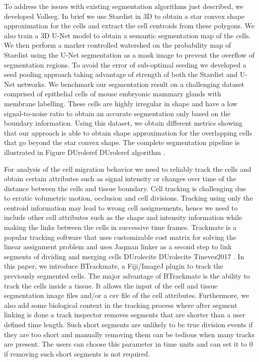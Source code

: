 \documentclass[letterpaper,compsoc,twoside]{IEEEtran}
\providecommand*{\DUrole}[2]{%
  \ifcsname DUrole#1\endcsname%
    \csname DUrole#1\endcsname{#2}%
  \else%
    #2%
  \fi%
}
\begin{document}
To address the issues with existing segmentation algorithms just described, we developed Vollseg. In brief we use Stardist in 3D to obtain a star convex shape approximation for the cells and extract the cell centroids from these polygons. We also train a 3D U-Net model to obtain a semantic segmentation map of the cells. We then perform a marker controlled watershed on the probability map of Stardist using the U-Net segmentation as a mask image to prevent the overflow of segmentation regions. To avoid the error of sub-optimal seeding we developed a seed pooling approach taking advantage of strength of both the Stardist and U-Net networks. We benchmark our segmentation result on a challenging dataset comprised of epithelial cells of mouse embryonic mammary glands with membrane labelling. These cells are highly irregular in shape and have a low signal-to-noise ratio to obtain an accurate segmentation only based on the boundary information. Using this dataset, we obtain different metrics showing that our approach is able to obtain shape approximation for the overlapping cells that go beyond the star convex shape. The complete segmentation pipeline is illustrated in Figure \DUrole{ref}{algorithm}.

For analysis of the cell migration behavior we need to reliably track the cells and obtain certain attributes such as signal intensity or changes over time of the distance between the cells and tissue boundary. Cell tracking is challenging due to erratic volumetric motion, occlusion and cell divisions. Tracking using only the centroid information may lead to wrong cell assigmements, hence we need to include other cell attributes such as the shape and intensity information while making the links between the cells in successive time frames. Trackmate is a popular tracking software that uses customizable cost matrix for solving the linear assignment problem and uses Jaqman linker as a second step to link segments of dividing and merging cells \DUrole{cite}{Tinevez2017}. In this paper, we introduce BTrackmate, a Fiji/ImageJ plugin to track the previously segmented cells. The major advantage of BTrackmate is the ability to track the cells inside a tissue. It allows the input of the cell and tissue segmentation image files and/or a csv file of the cell attributes. Furthermore, we also add some biological context in the tracking process where after segment linking is done a track inspector removes segments that are shorter than a user defined time length. Such short segments are unlikely to be true division events if they are too short and manually removing them can be tedious when many tracks are present. The users can choose this parameter in time units and can set it to 0 if removing such short segments is not required.
\end{document}
